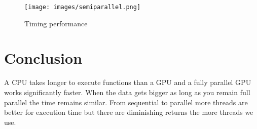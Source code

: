 \begin{figure}
   \begin{minipage}[t]{0.45\linewidth}
        \texttt{[image: images/semiparallel.png]}
        \caption{Timing performance}
        \label{figure:semiparallel}
    \end{minipage}
\end{figure}

\section{Conclusion}
\label{sec:conclusion}
A CPU takes longer to execute functions than a GPU and a fully parallel GPU works significantly faster. When the data gets bigger as long as you remain full parallel the time remains similar. From sequential to parallel more threads are better for execution time but there are diminishing returns the more threads we use.

